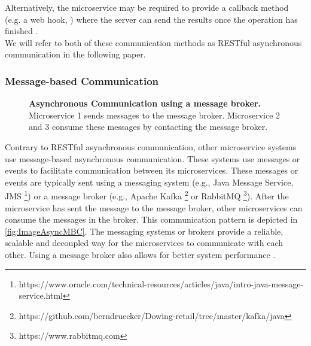 Alternatively, the microservice may be required to provide a callback method (e.g. a web hook, \cite{Webhooks}) where the server can send the results once the operation has finished \cite{Mayer2018}. \\

We will refer to both of these communication methods as RESTful asynchronous communication in the following paper.


\subsubsection{Message-based Communication}
\label{sec:Foundation:AsyncCommunication:MBC}

\begin{figure}
\centering
{}
\caption{\textbf{Asynchronous Communication using a message broker.} \\
Microservice 1 sends messages to the message broker. Microservice 2 and 3 consume these messages by contacting the message broker.}
\label{fig:ImageAsyncMBC}
\end{figure}

Contrary to RESTful asynchronous communication, other microservice systems use message-based asynchronous communication.
These systems use messages or events to facilitate communication between its microservices.
These messages or events are typically sent using a messaging system (e.g., Java Message Service, JMS \footnote{https://www.oracle.com/technical-resources/articles/java/intro-java-message-service.html}) or a message broker (e.g., Apache Kafka \footnote{https://github.com/berndruecker/Dowing-retail/tree/master/kafka/java} or RabbitMQ \footnote{https://www.rabbitmq.com}).
After the microservice has sent the message to the message broker, other microservices can consume the messages in the broker.
This communication pattern is depicted in \autoref{fig:ImageAsyncMBC}.
The messaging systems or brokers provide a reliable, scalable and decoupled way for the microservices to communicate with each other.
Using a message broker also allows for better system performance \cite{Singh2021}.


